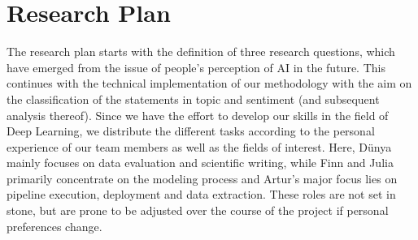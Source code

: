 \documentclass[11pt]{article}
\begin{document}
\section{Research Plan}

The research plan starts with the definition of three research questions, which have emerged from the issue of people’s perception of AI in the future. This continues with the technical implementation of our methodology with the aim on the classification of the statements in topic and sentiment (and subsequent analysis thereof). Since we have the effort to develop our skills in the field of Deep Learning, we distribute the different tasks according to the personal experience of our team members as well as the fields of interest. Here, Dünya mainly focuses on data evaluation and scientific writing, while Finn and Julia primarily concentrate on the modeling process and Artur's major focus lies on pipeline execution, deployment and data extraction. These roles are not set in stone, but are prone to be adjusted over the course of the project if personal preferences change.
\end{document}
